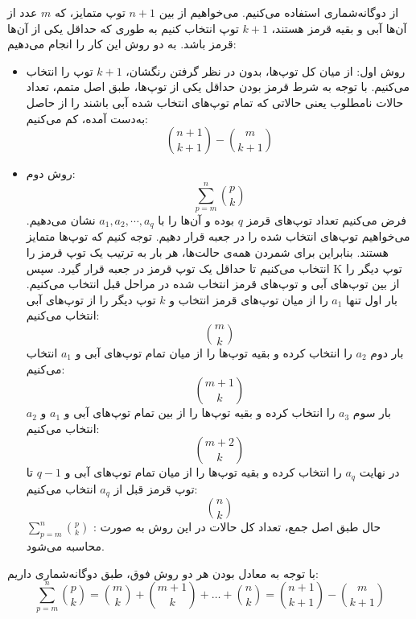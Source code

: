 \p		
از دوگانه‌شماری استفاده می‌کنیم. می‌خواهیم از بین
$n + 1$
توپ متمایز، که 
$m$
عدد از آن‌ها آبی و بقیه قرمز هستند، 
$k + 1$
توپ انتخاب کنیم به طوری که حداقل یکی از آن‌ها قرمز باشد. به دو روش این کار را انجام می‌دهیم:
\begin{itemize}
\item
روش اول: 
از میان کل توپ‌ها، بدون در نظر گرفتن رنگشان،
 $k + 1$
توپ را انتخاب می‌کنیم. با توجه به شرط قرمز بودن حداقل یکی از توپ‌ها، طبق اصل متمم، تعداد حالات نامطلوب یعنی حالاتی که تمام توپ‌های انتخاب شده آبی باشند را از حاصل به‌دست آمده، کم می‌کنیم:
$$\binom{n + 1}{k + 1} - \binom{m}{k + 1}$$
\item 
روش دوم:\[\sum\limits_{p=m}^{n}\binom{p}{k}\]
فرض می‌کنیم تعداد توپ‌های قرمز
$q$
بوده و آن‌ها را با
$a_1, a_2, \cdots, a_q$
نشان می‌دهیم. 
می‌خواهیم توپ‌های انتخاب شده را در جعبه قرار دهیم.
توجه کنیم که توپ‌ها متمایز هستند. بنابراین برای شمردن همه‌ی حالت‌ها، هر بار به ترتیب یک توپ قرمز را انتخاب می‌کنیم تا حداقل یک توپ قرمز در جعبه قرار گیرد.
سپس 
 K
 توپ دیگر را از بین توپ‌های آبی و توپ‌های قرمز انتخاب شده در مراحل قبل انتخاب می‌کنیم.
 بار اول تنها
$a_1$
را از میان توپ‌های قرمز انتخاب و
$k$
توپ دیگر را از توپ‌های آبی انتخاب می‌کنیم:
$$\binom{m}{k}$$
 بار دوم
$a_2$
را انتخاب کرده و بقیه توپ‌ها را از میان تمام توپ‌های آبی و 
$a_1$
 انتخاب ‌می‌کنیم:
 $$\binom{m + 1}{k}$$
بار سوم
$a_3$
را انتخاب کرده و بقیه توپ‌ها را از بین تمام توپ‌های آبی و 
$a_1$
 و 
 $a_2$
  انتخاب ‌می‌کنیم:
 $$\binom{m + 2}{k}$$
 در نهایت 
$a_q$
را انتخاب کرده و بقیه توپ‌ها را از میان تمام توپ‌های آبی و 
$q - 1$
تا توپ قرمز قبل از
$a_q$
 انتخاب می‌کنیم:
 $$\binom{n}{k}$$
حال طبق اصل جمع، تعداد کل حالات در این روش به صورت :
 $\sum\limits_{p=m}^{n}\binom{p}{k}$
محاسبه می‌شود.
\end{itemize}
با ‌توجه به معادل بودن هر دو روش فوق، طبق دوگانه‌شماری داریم:
$$\sum\limits_{p=m}^{n}\binom{p}{k} = \binom{m}{k} + \binom{m + 1}{k} +\ldots +
\binom{n}{k} = \binom{n + 1}{k + 1} - \binom{m}{k + 1}$$